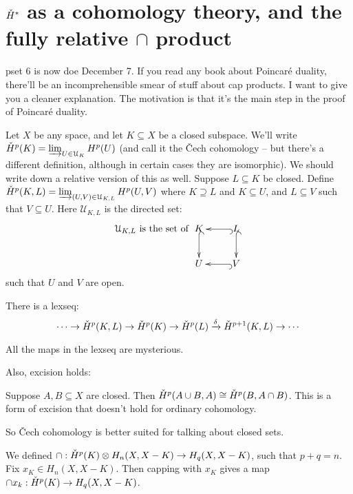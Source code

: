 \section{$\check{H}^\ast$ as a cohomology theory, and the fully relative $\cap$ product}
pset 6 is now doe December 7. If you read any book about Poincar\'{e} duality, there'll be an incomprehensible smear of stuff about cap products. I want to give you a cleaner explanation. The motivation is that it's the main step in the proof of Poincar\'{e} duality.

Let $X$ be any space, and let $K\subseteq X$ be a closed subspace. We'll write $\check{H}^p(K)=\varinjlim_{U\in\mathcal{U}_K} H^p(U)$ (and call it the \v{C}ech cohomology -- but there's a different definition, although in certain cases they are isomorphic). We should write down a relative version of this as well. Suppose $L\subseteq K$ be closed. Define $\check{H}^p(K,L)=\varinjlim_{(U,V)\in\mathcal{U}_{K,L}} H^p(U,V)$ where $K\supseteq L$ and $K\subseteq U$, and $L\subseteq V$ such that $V\subseteq U$. Here $\mathcal{U}_{K,L}$ is the directed set:
\begin{equation*}
\mathcal{U}_{K,L}\text{ is the set of }\xymatrix{K\ar@{^(->}[d] & L\ar@{^(->}[d]\ar@{^(->}[l] \\ U & V\ar@{^(->}[l]}
\end{equation*}
such that $U$ and $V$ are open.
\begin{theorem}
There is a lexseq:
\begin{equation*}
\cdots\to\check{H}^p(K,L)\to\check{H}^p(K)\to\check{H}^p(L)\xrightarrow{\delta}\check{H}^{p+1}(K,L)\to\cdots
\end{equation*}
\end{theorem}
All the maps in the lexseq are mysterious.

Also, excision holds:
\begin{theorem}[Excision]
Suppose $A,B\subseteq X$ are closed. Then $\check{H}^p(A\cup B,A)\cong\check{H}^p(B,A\cap B)$. This is a form of excision that doesn't hold for ordinary cohomology.
\end{theorem}
So \v{C}ech cohomology is better suited for talking about closed sets. 

We defined $\cap:\check{H}^p(K)\otimes H_n(X,X-K)\to H_q(X,X-K)$, such that $p+q=n$. Fix $x_K\in H_n(X,X-K)$. Then capping with $x_K$ gives a map $\cap x_k:\check{H}^p(K)\to H_q(X,X-K)$.

